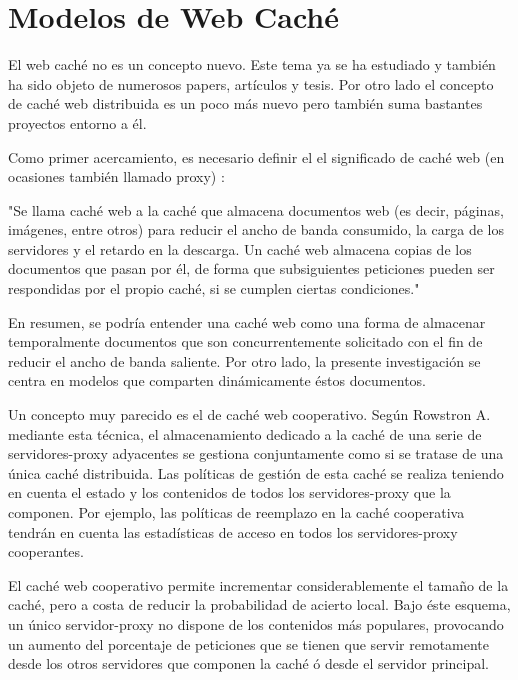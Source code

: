 
\chapter{Modelos de Web Caché} %

\label{ch:modelos_web_caching} %

El web caché no es un concepto nuevo. Este tema ya se ha estudiado y también ha sido objeto de numerosos papers, artículos y tesis. Por otro lado el concepto de caché web distribuida es un poco más nuevo pero también suma bastantes proyectos entorno a él.

Como primer acercamiento, es necesario definir el el significado de caché web (en ocasiones también llamado proxy) \cite{wiki_cacheweb}:

"Se llama caché web a la caché que almacena documentos web (es decir, páginas, imágenes, entre otros) para reducir el ancho de banda consumido, la carga de los servidores y el retardo en la descarga. Un caché web almacena copias de los documentos que pasan por él, de forma que subsiguientes peticiones pueden ser respondidas por el propio caché, si se cumplen ciertas condiciones." 

En resumen, se podría entender una caché web como una forma de almacenar temporalmente documentos que son concurrentemente solicitado con el fin de reducir el ancho de banda saliente. Por otro lado, la presente investigación se centra en modelos que comparten dinámicamente éstos documentos. 

Un concepto muy parecido es el de caché web cooperativo. Según Rowstron A. \cite{rowstron:2001} mediante esta técnica, el almacenamiento dedicado a la caché de una serie de servidores-proxy adyacentes se gestiona conjuntamente como si se tratase de una única caché distribuida. Las políticas de gestión de esta caché se realiza teniendo en cuenta el estado y los contenidos de todos los servidores-proxy que la componen. Por ejemplo, las políticas de reemplazo en la caché cooperativa tendrán en cuenta las estadísticas de acceso en todos los servidores-proxy cooperantes.

El caché web cooperativo permite incrementar considerablemente el tamaño de la caché, pero a costa de
reducir la probabilidad de acierto local. Bajo éste esquema, un único servidor-proxy no dispone de los contenidos más populares, provocando un aumento del porcentaje de peticiones que se tienen que servir remotamente desde los otros servidores que componen la caché ó desde el servidor principal.

